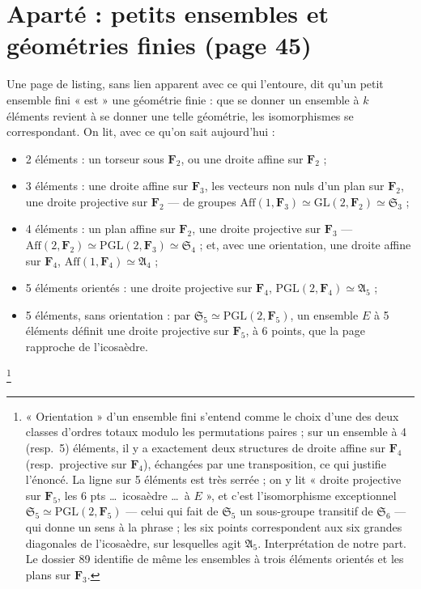 \documentclass[11pt,a4paper]{article}
\begin{document}
\section*{Aparté : petits ensembles et géométries finies (page 45)}

Une page de listing, sans lien apparent avec ce qui l'entoure, dit qu'un
petit ensemble fini « est » une géométrie finie : que se donner un ensemble à
$k$ éléments revient à se donner une telle géométrie, les isomorphismes se
correspondant. On lit, avec ce qu'on sait aujourd'hui :
\begin{itemize}
  \item 2 éléments : un torseur sous $\mathbf{F}_2$, ou une droite affine sur
  $\mathbf{F}_2$ ;
  \item 3 éléments : une droite affine sur $\mathbf{F}_3$, les vecteurs non
  nuls d'un plan sur $\mathbf{F}_2$, une droite projective sur $\mathbf{F}_2$
  --- de groupes $\mathrm{Aff}(1, \mathbf{F}_3) \simeq \mathrm{GL}(2,
  \mathbf{F}_2) \simeq \mathfrak{S}_3$ ;
  \item 4 éléments : un plan affine sur $\mathbf{F}_2$, une droite projective
  sur $\mathbf{F}_3$ --- $\mathrm{Aff}(2, \mathbf{F}_2) \simeq
  \mathrm{PGL}(2, \mathbf{F}_3) \simeq \mathfrak{S}_4$ ; et, avec une
  orientation, une droite affine sur $\mathbf{F}_4$, $\mathrm{Aff}(1,
  \mathbf{F}_4) \simeq \mathfrak{A}_4$ ;
  \item 5 éléments orientés : une droite projective sur $\mathbf{F}_4$,
  $\mathrm{PGL}(2, \mathbf{F}_4) \simeq \mathfrak{A}_5$ ;
  \item 5 éléments, sans orientation : par $\mathfrak{S}_5 \simeq
  \mathrm{PGL}(2, \mathbf{F}_5)$, un ensemble $E$ à 5 éléments définit une
  droite projective sur $\mathbf{F}_5$, à 6 points, que la page rapproche
  de l'icosaèdre.
\end{itemize}
\footnote{« Orientation » d'un ensemble fini s'entend comme le choix d'une
des deux classes d'ordres totaux modulo les permutations paires ; sur un
ensemble à 4 (resp.\ 5) éléments, il y a exactement deux structures de droite
affine sur $\mathbf{F}_4$ (resp.\ projective sur $\mathbf{F}_4$), échangées
par une transposition, ce qui justifie l'énoncé. La ligne sur 5 éléments est
très serrée ; on y lit « droite projective sur $\mathbf{F}_5$, les 6 pts
\ldots\ icosaèdre \ldots\ à $E$ », et c'est l'isomorphisme exceptionnel
$\mathfrak{S}_5 \simeq \mathrm{PGL}(2, \mathbf{F}_5)$ --- celui qui fait de
$\mathfrak{S}_5$ un sous-groupe transitif de $\mathfrak{S}_6$ --- qui donne
un sens à la phrase ; les six points correspondent aux six grandes diagonales
de l'icosaèdre, sur lesquelles agit $\mathfrak{A}_5$. Interprétation de notre
part. Le dossier 89 identifie de même les ensembles à trois éléments orientés
et les plans sur $\mathbf{F}_3$.}
\end{document}
